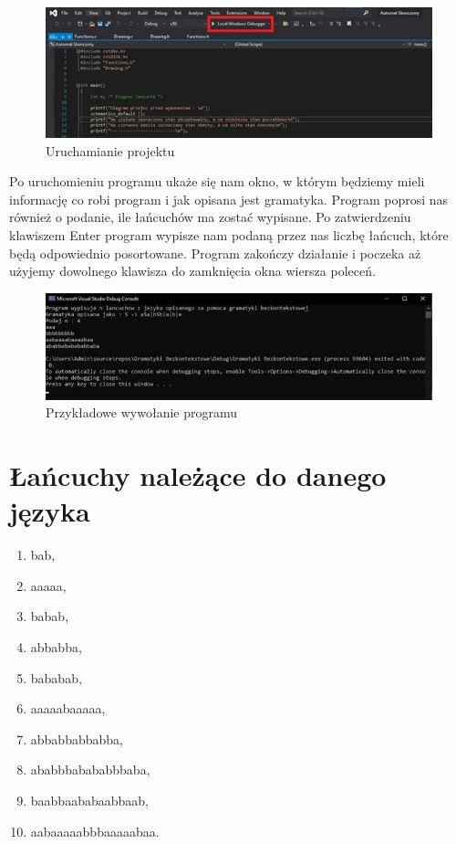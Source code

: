 \documentclass[10pt, a4paper]{report}
\begin{document}
    \begin{figure}[h]
        \begin{center}
            \includegraphics[scale=0.9]{photo3.jpg}
            \caption{Uruchamianie projektu}
        \end{center}
    \end{figure}

    Po uruchomieniu programu ukaże się nam okno, w którym będziemy mieli informację co robi
    program i jak opisana jest gramatyka. Program poprosi nas również o podanie, ile łańcuchów ma
    zostać wypisane. Po zatwierdzeniu klawiszem Enter program wypisze nam podaną przez nas liczbę
    łańcuch, które będą odpowiednio posortowane. Program zakończy działanie i poczeka aż użyjemy
    dowolnego klawisza do zamknięcia okna wiersza poleceń.

    \begin{figure}[h]
        \begin{center}
            \includegraphics[scale=0.9]{photo4.jpg}
            \caption{Przykładowe wywołanie programu}
        \end{center}
    \end{figure}

    \section{Łańcuchy należące do danego języka}
    \begin{enumerate}
        \item bab,
        \item aaaaa,
        \item babab,
        \item abbabba,
        \item bababab,
        \item aaaaabaaaaa,
        \item abbabbabbabba,
        \item ababbbabababbbaba,
        \item baabbaababaabbaab,
        \item aabaaaaabbbaaaaabaa.
    \end{enumerate}
\end{document}
